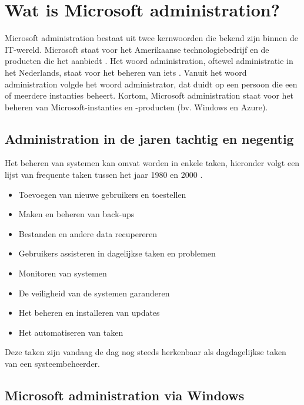 \section{Wat is Microsoft administration?}


Microsoft administration bestaat uit twee kernwoorden die bekend zijn binnen de \ac{IT}-wereld. Microsoft staat voor het Amerikaanse technologiebedrijf en de producten die het aanbiedt \autocite{Warner2019}. Het woord administration, oftewel administratie in het Nederlands, staat voor het beheren van iets \autocite{Burgess2003}. Vanuit het woord administration volgde het woord administrator, dat duidt op een persoon die een of meerdere instanties beheert. Kortom, Microsoft administration staat voor het beheren van Microsoft-instanties en -producten (bv. Windows en Azure). 


\subsection{Administration in de jaren tachtig en negentig}


Het beheren van systemen kan omvat worden in enkele taken, hieronder volgt een lijst van frequente taken tussen het jaar 1980 en 2000 \autocite{Frisch2002}.

\begin{itemize}
    \item Toevoegen van nieuwe gebruikers en toestellen
    \item Maken en beheren van back-ups
    \item Bestanden en andere data recupereren
    \item Gebruikers assisteren in dagelijkse taken en problemen
    \item Monitoren van systemen
    \item De veiligheid van de systemen garanderen
    \item Het beheren en installeren van updates
    \item Het automatiseren van taken
\end{itemize}

Deze taken zijn vandaag de dag nog steeds herkenbaar als dagdagelijkse taken van een systeembeheerder. 

\subsection{Microsoft administration via Windows}

